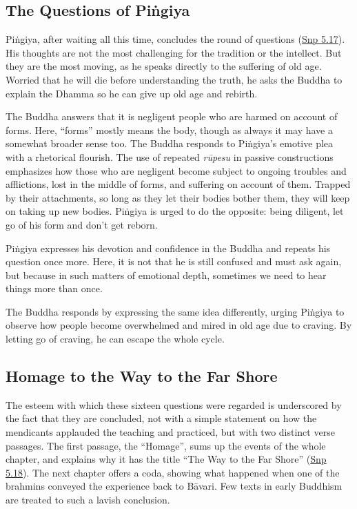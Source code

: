 \documentclass[12pt,openany]{book}%
\begin{document}
\subsection*{The Questions of \textsanskrit{Piṅgiya}}

\textsanskrit{Piṅgiya}, after waiting all this time, concludes the round of questions (\href{https://suttacentral.net/snp5.17/en/sujato}{Snp 5.17}). His thoughts are not the most challenging for the tradition or the intellect. But they are the most moving, as he speaks directly to the suffering of old age. Worried that he will die before understanding the truth, he asks the Buddha to explain the Dhamma so he can give up old age and rebirth.

The Buddha answers that it is negligent people who are harmed on account of forms. Here, “forms” mostly means the body, though as always it may have a somewhat broader sense too. The Buddha responds to \textsanskrit{Piṅgiya}’s emotive plea with a rhetorical flourish. The use of repeated \textit{\textsanskrit{rūpesu}} in passive constructions emphasizes how those who are negligent become subject to ongoing troubles and afflictions, lost in the middle of forms, and suffering on account of them. Trapped by their attachments, so long as they let their bodies bother them, they will keep on taking up new bodies. \textsanskrit{Piṅgiya} is urged to do the opposite: being diligent, let go of his form and don’t get reborn.

\textsanskrit{Piṅgiya} expresses his devotion and confidence in the Buddha and repeats his question once more. Here, it is not that he is still confused and must ask again, but because in such matters of emotional depth, sometimes we need to hear things more than once.

The Buddha responds by expressing the same idea differently, urging \textsanskrit{Piṅgiya} to observe how people become overwhelmed and mired in old age due to craving. By letting go of craving, he can escape the whole cycle.

\subsection*{Homage to the Way to the Far Shore}

The esteem with which these sixteen questions were regarded is underscored by the fact that they are concluded, not with a simple statement on how the mendicants applauded the teaching and practiced, but with two distinct verse passages. The first passage, the “Homage”, sums up the events of the whole chapter, and explains why it has the title “The Way to the Far Shore” (\href{https://suttacentral.net/snp5.18/en/sujato}{Snp 5.18}). The next chapter offers a coda, showing what happened when one of the brahmins conveyed the experience back to \textsanskrit{Bāvari}. Few texts in early Buddhism are treated to such a lavish conclusion.
\end{document}
